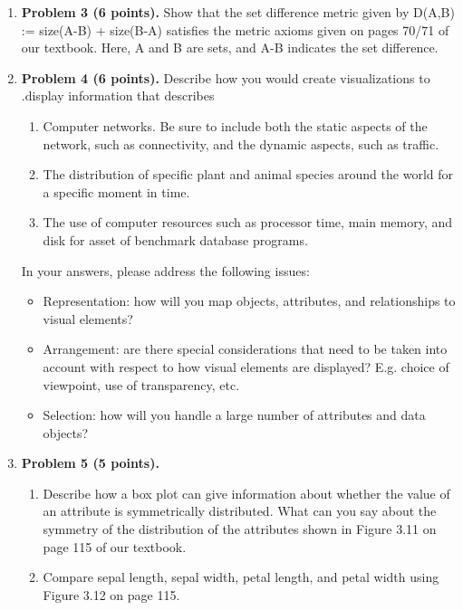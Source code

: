 \documentclass{article}%
\begin{document}
\begin{enumerate}
 \item\textbf{Problem 3 (6 points). } Show that the set difference metric given by D(A,B) := size(A-B) + size(B-A) satisfies the metric axioms given on pages 70/71 of our textbook. Here, A and B are sets, and A-B indicates the set difference.


\item \textbf{Problem 4 (6 points).} Describe how you would create visualizations to .display information that describes
 \begin{enumerate}
		\item Computer networks. Be sure to include both the static aspects of the network, such as connectivity, and the dynamic aspects, such as traffic.
		\item The distribution of specific plant and animal species around the world for a specific moment in time.
		\item The use of computer resources such as processor time, main memory, and disk for asset of benchmark database programs.
 \end{enumerate}
 
In your answers, please address the following issues:
\begin{itemize}
\item Representation: how will you map objects, attributes, and relationships to visual elements?
\item Arrangement: are there special considerations that need to be taken into account with respect to how visual elements are displayed? E.g. choice of viewpoint, use of transparency, etc.
\item Selection: how will you handle a large number of attributes and data objects?
\end{itemize}

\item \textbf{Problem 5 (5 points).}
 \begin{enumerate}
		\item Describe how a box plot can give information about whether the value of an attribute is symmetrically distributed. What can you say about the symmetry of the distribution of the attributes shown in Figure 3.11 on page 115 of our textbook.
		\item Compare sepal length, sepal width, petal length, and petal width using Figure 3.12 on page 115.
 \end{enumerate}



\end{enumerate}
\end{document}
